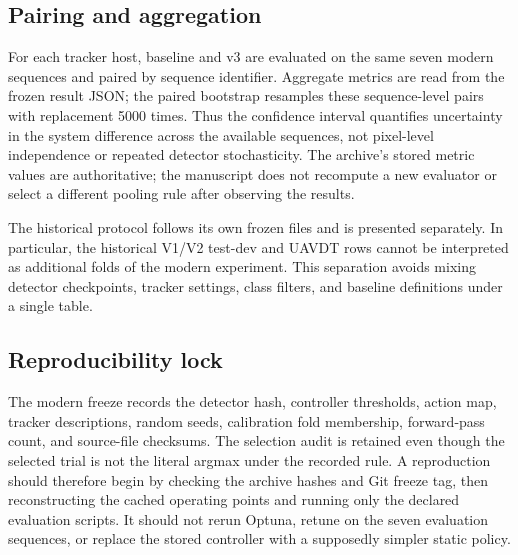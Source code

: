 \subsection{Pairing and aggregation}
For each tracker host, baseline and v3 are evaluated on the same seven modern sequences and paired by sequence identifier. Aggregate metrics are read from the frozen result JSON; the paired bootstrap resamples these sequence-level pairs with replacement 5000 times. Thus the confidence interval quantifies uncertainty in the system difference across the available sequences, not pixel-level independence or repeated detector stochasticity. The archive's stored metric values are authoritative; the manuscript does not recompute a new evaluator or select a different pooling rule after observing the results.

The historical protocol follows its own frozen files and is presented separately. In particular, the historical V1/V2 test-dev and UAVDT rows cannot be interpreted as additional folds of the modern experiment. This separation avoids mixing detector checkpoints, tracker settings, class filters, and baseline definitions under a single table.

\subsection{Reproducibility lock}
The modern freeze records the detector hash, controller thresholds, action map, tracker descriptions, random seeds, calibration fold membership, forward-pass count, and source-file checksums. The selection audit is retained even though the selected trial is not the literal argmax under the recorded rule. A reproduction should therefore begin by checking the archive hashes and Git freeze tag, then reconstructing the cached operating points and running only the declared evaluation scripts. It should not rerun Optuna, retune on the seven evaluation sequences, or replace the stored controller with a supposedly simpler static policy.
